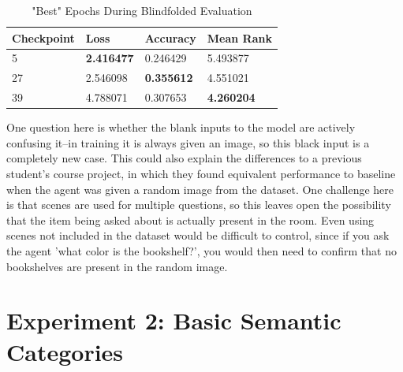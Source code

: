 \begin{table}[H]
\centering
\caption{"Best" Epochs During Blindfolded Evaluation}
\begin{tabular}{l | l | l | l}
Checkpoint & Loss & Accuracy & Mean Rank \\
\hline
5 & \textbf{2.416477} & 0.246429 & 5.493877 \\
27 & 2.546098 & \textbf{0.355612} & 4.551021 \\
39 & 4.788071 & 0.307653 & \textbf{4.260204}
\end{tabular}
\label{tab:best_blindfolded}
\end{table}

One question here is whether the blank inputs to the model are actively confusing it--in training it is always given an image, so this black input is a completely new case. This could also explain the differences to a previous student's course project, in which they found equivalent performance to baseline when the agent was given a random image from the dataset. One challenge here is that scenes are used for multiple questions, %
so this leaves open the possibility that the item being asked about is actually present in the room. Even using scenes not included in the dataset would be difficult to control, since if you ask the agent 'what color is the bookshelf?', you would then need to confirm that no bookshelves are present in the random image. \newline



\section{Experiment 2: Basic Semantic Categories}
\label{sec:exp_2}
